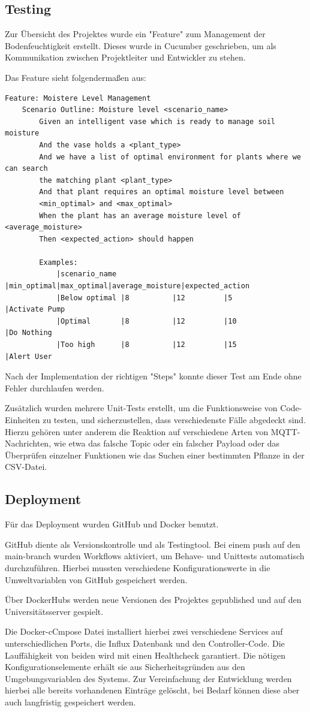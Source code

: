 \subsection{Testing}
Zur Übersicht des Projektes wurde ein "Feature" zum Management der Bodenfeuchtigkeit erstellt. Dieses wurde in Cucumber geschrieben, um als Kommunikation zwischen Projektleiter und Entwickler zu stehen. 

Das Feature sieht folgendermaßen aus:
\begin{verbatim}
Feature: Moistere Level Management
    Scenario Outline: Moisture level <scenario_name>
        Given an intelligent vase which is ready to manage soil moisture
        And the vase holds a <plant_type>
        And we have a list of optimal environment for plants where we can search
        the matching plant <plant_type>
        And that plant requires an optimal moisture level between
        <min_optimal> and <max_optimal>
        When the plant has an average moisture level of <average_moisture>
        Then <expected_action> should happen

        Examples:
            |scenario_name |min_optimal|max_optimal|average_moisture|expected_action
            |Below optimal |8          |12         |5               |Activate Pump 
            |Optimal       |8          |12         |10              |Do Nothing  
            |Too high      |8          |12         |15              |Alert User    
\end{verbatim}

Nach der Implementation der richtigen "Steps" konnte dieser Test am Ende ohne Fehler durchlaufen werden.

Zusätzlich wurden mehrere Unit-Tests erstellt, um die Funktionsweise von Code-Einheiten zu testen, und sicherzustellen, dass verschiedenste Fälle abgedeckt sind. Hierzu gehören unter anderem die Reaktion auf verschiedene Arten von MQTT-Nachrichten, wie etwa das falsche Topic oder ein falscher Payload oder das Überprüfen einzelner Funktionen wie das Suchen einer bestimmten Pflanze in der CSV-Datei.

\subsection{Deployment}
Für das Deployment wurden GitHub und Docker benutzt.

GitHub diente als Versionskontrolle und als Testingtool. Bei einem push auf den main-branch wurden Workflows aktiviert, um Behave- und Unittests automatisch durchzuführen. Hierbei mussten verschiedene Konfigurationswerte in die Umweltvariablen von GitHub gespeichert werden.

Über DockerHubs werden neue Versionen des Projektes gepublished und auf den Universitätsserver gespielt.

Die Docker-cCmpose Datei installiert hierbei zwei verschiedene Services auf unterschiedlichen Ports, die Influx Datenbank und den Controller-Code. Die Lauffähigkeit von beiden wird mit einen Healthcheck garantiert. Die nötigen Konfigurationselemente erhält sie aus Sicherheitsgründen aus den Umgebungsvariablen des Systems. Zur Vereinfachung der Entwicklung werden hierbei alle bereits vorhandenen Einträge gelöscht, bei Bedarf können diese aber auch langfristig gespeichert werden.